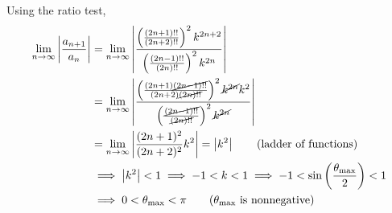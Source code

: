 \documentclass[preview]{standalone}
\begin{document}
\color{white}

Using the ratio test,
\begin{align*}
  \lim_{n \to \infty} \left|\frac{a_{n+1}}{a_n}\right| &= \lim_{n \to \infty} \left|\frac{\left(\frac{(2n+1)!!}{(2n+2)!!}\right)^2 k^{2n+2}}{\left(\frac{(2n-1)!!}{(2n)!!}\right)^2 k^{2n}}\right| \\
  &= \lim_{n \to \infty} \left|\frac{\left(\frac{(2n+1)\cancel{(2n-1)!!}}{(2n+2)\cancel{(2n)!!}}\right)^2 \cancel{k^{2n}}k^2}{\left(\frac{\cancel{(2n-1)!!}}{\cancel{(2n)!!}}\right)^2 \cancel{k^{2n}}}\right| \\
  &= \lim_{n \to \infty} \left|\frac{(2n+1)^2}{(2n+2)^2} k^2\right| = \left|k^2\right| \tag{\text{ladder of functions}} \\
  &\implies \left|k^2\right| < 1 \implies -1 < k < 1 \implies -1 < \sin\left(\frac{\theta_{\mathrm{max}}}{2}\right) < 1 \\
  &\implies 0 < \theta_{\mathrm{max}} < \pi \tag{\text{$\theta_{\mathrm{max}}$ is nonnegative}}
\end{align*}
\end{document}
